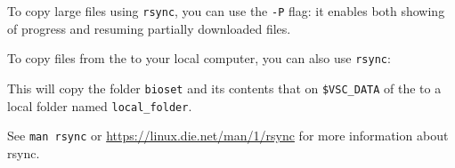 To copy large files using \verb|rsync|, you can use the \verb|-P| flag: it enables
both showing of progress and resuming partially downloaded files.

To copy files from the \hpc to your local computer, you can also use \verb|rsync|:

\begin{prompt}
\end{prompt}

This will copy the folder \verb|bioset| and its contents that on \verb|$VSC_DATA| of
the \hpc to a local folder named \verb|local_folder|.

See \verb|man rsync| or \url{https://linux.die.net/man/1/rsync} for more information about rsync.
